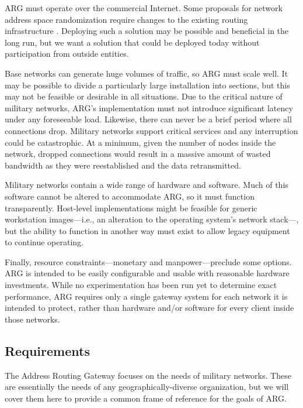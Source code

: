 \par ARG must operate over the commercial Internet. Some proposals for network address space randomization require changes to the existing routing infrastructure \cite{CONTRA}. Deploying such a solution may be possible and beneficial in the long run, but we want a solution that could be deployed today without participation from outside entities.

\par Base networks can generate huge volumes of traffic, so ARG must scale well. It may be possible to divide a particularly large installation into sections, but this may not be feasible or desirable in all situations. Due to the critical nature of military networks, ARG's implementation must not introduce significant latency under any foreseeable load. Likewise, there can never be a brief period where all connections drop. Military networks support critical services and any interruption could be catastrophic. At a minimum, given the number of nodes inside the network, dropped connections would result in a massive amount of wasted bandwidth as they were reestablished and the data retransmitted.

\par Military networks contain a wide range of hardware and software. Much of this software cannot be altered to accommodate ARG, so it must function transparently. Host-level implementations might be feasible for generic workstation images---i.e., an alteration to the operating system's network stack---, but the ability to function in another way must exist to allow legacy equipment to continue operating.

\par Finally, resource constraints---monetary and manpower---preclude some options. ARG is intended to be easily configurable and usable with reasonable hardware investments. While no experimentation has been run yet to determine exact performance, ARG requires only a single gateway system for each network it is intended to protect, rather than hardware and/or software for every client inside those networks.


\subsection{Requirements}
\par The Address Routing Gateway focuses on the needs of military networks. These are essentially the needs of any geographically-diverse organization, but we will cover them here to provide a common frame of reference for the goals of ARG. 

